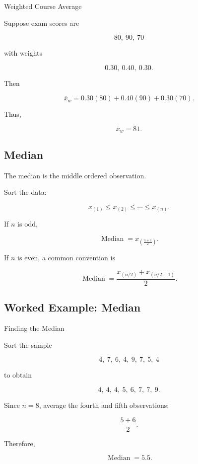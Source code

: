 \begin{workedexamplebox}{Weighted Course Average}

Suppose exam scores are

\[
80,\ 90,\ 70
\]

with weights

\[
0.30,\ 0.40,\ 0.30.
\]

Then

\[
\overline{x}_w
=
0.30(80)
+
0.40(90)
+
0.30(70).
\]

Thus,

\begin{answerbox}
\[
\boxed{
\overline{x}_w
=
81.
}
\]
\end{answerbox}

\end{workedexamplebox}

\subsection{Median}
\label{subsec:median}

The median is the middle ordered observation.

Sort the data:

\[
x_{(1)}
\leq
x_{(2)}
\leq
\cdots
\leq
x_{(n)}.
\]

If \(n\) is odd,

\[
\boxed{
\operatorname{Median}
=
x_{\left(\frac{n+1}{2}\right)}.
}
\]

If \(n\) is even, a common convention is

\[
\boxed{
\operatorname{Median}
=
\frac{
x_{(n/2)}
+
x_{(n/2+1)}
}{2}.
}
\]

\subsection{Worked Example: Median}
\label{subsec:worked-median}

\begin{workedexamplebox}{Finding the Median}

Sort the sample

\[
4,\ 7,\ 6,\ 4,\ 9,\ 7,\ 5,\ 4
\]

to obtain

\[
4,\ 4,\ 4,\ 5,\ 6,\ 7,\ 7,\ 9.
\]

Since \(n=8\), average the fourth and fifth observations:

\[
\frac{5+6}{2}.
\]

Therefore,

\begin{answerbox}
\[
\boxed{
\operatorname{Median}
=
5.5.
}
\]
\end{answerbox}

\end{workedexamplebox}

